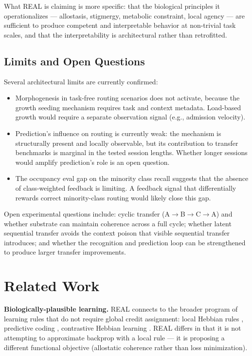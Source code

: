 \documentclass[letterpaper]{article}
\begin{document}
What REAL is claiming is more specific: that the biological principles it operationalizes — allostasis, stigmergy, metabolic constraint, local agency — are sufficient to produce competent and interpretable behavior at non-trivial task scales, and that the interpretability is architectural rather than retrofitted.

\subsection{Limits and Open Questions}

Several architectural limits are currently confirmed:
\begin{itemize}
    \item Morphogenesis in task-free routing scenarios does not activate, because the growth seeding mechanism requires task and context metadata. Load-based growth would require a separate observation signal (e.g., admission velocity).
    \item Prediction's influence on routing is currently weak: the mechanism is structurally present and locally observable, but its contribution to transfer benchmarks is marginal in the tested session lengths. Whether longer sessions would amplify prediction's role is an open question.
    \item The occupancy eval gap on the minority class recall suggests that the absence of class-weighted feedback is limiting. A feedback signal that differentially rewards correct minority-class routing would likely close this gap.
\end{itemize}

Open experimental questions include: cyclic transfer (A$\rightarrow$B$\rightarrow$C$\rightarrow$A) and whether substrate can maintain coherence across a full cycle; whether latent sequential transfer avoids the context poison that visible sequential transfer introduces; and whether the recognition and prediction loop can be strengthened to produce larger transfer improvements.

\section{Related Work}

\textbf{Biologically-plausible learning.} REAL connects to the broader program of learning rules that do not require global credit assignment: local Hebbian rules \citep{placeholder}, predictive coding \citep{placeholder}, contrastive Hebbian learning \citep{placeholder}. REAL differs in that it is not attempting to approximate backprop with a local rule — it is proposing a different functional objective (allostatic coherence rather than loss minimization).
\end{document}
